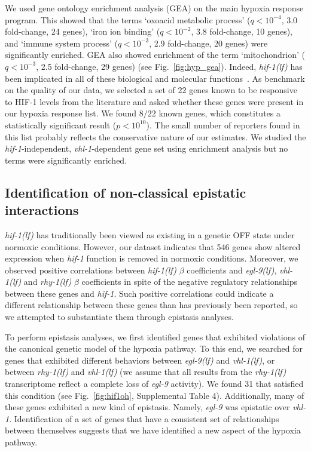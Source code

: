 \documentclass[10pt, onecolumn]{article}
\newcommand{\qval}[1]{$q<10^{-#1}$}
\newcommand{\gene}[1]{\emph{#1}}
\newcommand{\egl}{\emph{\mbox{egl-9}(lf)}}
\newcommand{\rhy}{\emph{\mbox{rhy-1}(lf)}}
\newcommand{\vhl}{\emph{\mbox{vhl-1}(lf)}}
\newcommand{\hif}{\emph{\mbox{hif-1(lf)}}}
\newcommand{\hifp}{HIF-1}
\newcommand{\hifn}{546}
\newcommand{\hifohtargets}{31}
\begin{document}
We used gene ontology enrichment analysis (GEA) on the main hypoxia response program.
This showed that the terms `oxoacid metabolic process' (\qval{4}, 3.0 fold-change,
24 genes), `iron ion binding' (\qval{2}, 3.8 fold-change, 10 genes), and `immune
system process' (\qval{3}, 2.9 fold-change, 20 genes) were significantly enriched.
GEA also showed enrichment of the term `mitochondrion' (\qval{3}, 2.5 fold-change,
29 genes) (see Fig.~\ref{fig:hyp_gea}). Indeed, \hif{} has been implicated in
all of these biological and molecular functions~\cite{Luhachack2012,Ackerman2012,
Romney2011,Semenza2011}.
As benchmark on the quality of our data, we selected a set of 22 genes known to
be responsive to \hifp{} levels from the literature and asked whether these genes
were present in our hypoxia response list. We found $8/22$ known genes, which
constitutes a statistically significant result ($p<10^{10}$). The small number of
reporters found in this list probably reflects the conservative nature of our
estimates.
We studied the \gene{hif-1}-independent, \gene{vhl-1}-dependent gene set
using enrichment analysis but no terms were significantly enriched.

\subsection*{Identification of non-classical epistatic interactions}
\label{sub:hifoh}
\hif{} has traditionally been viewed as existing in a genetic OFF state under
normoxic conditions. However, our dataset indicates that \hifn{} genes show
altered expression when \gene{hif-1} function is removed in normoxic conditions.
Moreover, we observed positive correlations between \hif{} $\beta$ coefficients
and \egl{}, \vhl{} and \rhy{} $\beta$ coefficients in spite of the negative
regulatory relationships between these genes and \gene{hif-1}. Such
positive correlations could indicate a different relationship between these genes
than has previously been reported, so we attempted to substantiate them through
epistasis analyses.

To perform epistasis analyses, we first identified genes that exhibited violations
of the canonical genetic model of the hypoxia pathway. To this end, we searched for
genes that exhibited different behaviors between \egl{} and \vhl{}, or
between \rhy{} and \vhl{} (we assume that all results from the
\rhy{} transcriptome reflect a complete loss of \gene{egl-9} activity). We found
\hifohtargets{} that satisfied this condition (see Fig.~\ref{fig:hif1oh},
Supplemental Table 4).
Additionally, many of these genes exhibited a new kind of epistasis. Namely,
\gene{egl-9} was epistatic over \gene{vhl-1}. Identification of a set of genes
that have a consistent set of relationships between themselves suggests that
we have identified a new aspect of the hypoxia pathway.
\end{document}
